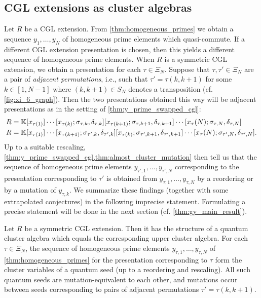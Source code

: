 \subsection{CGL extensions as cluster algebras}

Let $R$ be a CGL extension. From \cref{thm:homogeneous_primes} we obtain a sequence
$y_1, \dots, y_N$ of homogeneous prime elements which quasi-commute. If a different CGL
extension presentation is chosen, then this yields a different sequence of homogeneous
prime elements. When $R$ is a symmetric CGL extension, we obtain a presentation for
each $\tau \in \Xi_N$. Suppose that $\tau, \tau' \in \Xi_N$ are a pair of
\emph{adjacent permutations}, i.e., such that $\tau' = \tau
	(k, k+1)$ for some $k \in [1, N-1]$ where $(k, k+1) \in S_N$ denotes a transposition
(cf. \cref{fig:xi_6_graph}). Then the two presentations obtained this way will be
adjacent presentations as in the setting of \cref{thm:y_prime_swapped_cgl}:
\begin{align*}
	 & R = \mathbb{K}[x_{\tau(1)}]\cdots [x_{\tau(k)}; \sigma_{\tau, k}, \delta_{\tau, k}][x_{\tau(k+1)};\sigma_{\tau, k+1}, \delta_{\tau, k+1}] \cdots [x_\tau(N); \sigma_{\tau, N}, \delta_{\tau, N}]        \\
	 & R = \mathbb{K}[x_{\tau(1)}]\cdots [x_{\tau(k+1)}; \sigma_{\tau', k}, \delta_{\tau', k}][x_{\tau(k)};\sigma_{\tau', k+1}, \delta_{\tau', k+1}] \cdots [x_\tau(N); \sigma_{\tau', N}, \delta_{\tau', N}].
\end{align*}
%
Up to a suitable rescaling, \cref{thm:y_prime_swapped_cgl,thm:almost_cluster_mutation}
then tell us that the sequence of homogeneous prime elements $y_{\tau', 1}, \dots,
	y_{\tau', N}$ corresponding to the presentation corresponding to $\tau'$ is obtained
from $y_{\tau, 1}, \dots, y_{\tau, N}$ by a reordering or by a mutation of $y_{\tau,
			k}$. We summarize these findings (together with some extrapolated conjectures) in the
following imprecise statement. Formulating a precise statement will be done in the next
section (cf. \cref{thm:gy_main_result}).

\begin{theorem*}
	Let $R$ be a symmetric CGL extension. Then it has the structure of a quantum cluster
	algebra which equals the corresponding upper cluster algebra. For each $\tau \in
		\Xi_N$, the sequence of homogeneous prime elements $y_{\tau, 1}, \dots, y_{\tau, N}$ of
	\cref{thm:homogeneous_primes} for the presentation corresponding to $\tau$ form the
	cluster variables of a quantum seed (up to a reordering and rescaling). All such
	quantum seeds are mutation-equivalent to each other, and mutations occur between seeds
	corresponding to pairs of adjacent permutations $\tau' = \tau(k, k+1)$.
\end{theorem*}

